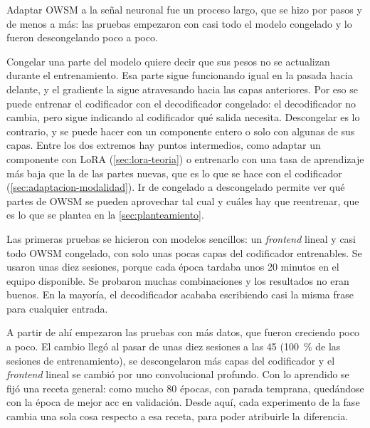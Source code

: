 
Adaptar OWSM a la señal neuronal fue un proceso largo, que se hizo por pasos y de menos a más: las pruebas empezaron con casi todo el modelo congelado y lo fueron descongelando poco a poco.

Congelar una parte del modelo quiere decir que sus pesos no se actualizan durante el entrenamiento. Esa parte sigue funcionando igual en la pasada hacia delante, y el gradiente la sigue atravesando hacia las capas anteriores. Por eso se puede entrenar el codificador con el decodificador congelado: el decodificador no cambia, pero sigue indicando al codificador qué salida necesita. Descongelar es lo contrario, y se puede hacer con un componente entero o solo con algunas de sus capas. Entre los dos extremos hay puntos intermedios, como adaptar un componente con LoRA (\cref{sec:lora-teoria}) o entrenarlo con una tasa de aprendizaje más baja que la de las partes nuevas, que es lo que se hace con el codificador (\cref{sec:adaptacion-modalidad}). Ir de congelado a descongelado permite ver qué partes de OWSM se pueden aprovechar tal cual y cuáles hay que reentrenar, que es lo que se plantea en la \cref{sec:planteamiento}.

Las primeras pruebas se hicieron con modelos sencillos: un \textit{frontend} lineal y casi todo OWSM congelado, con solo unas pocas capas del codificador entrenables. Se usaron unas diez sesiones, porque cada época tardaba unos 20 minutos en el equipo disponible. Se probaron muchas combinaciones y los resultados no eran buenos. En la mayoría, el decodificador acababa escribiendo casi la misma frase para cualquier entrada.

A partir de ahí empezaron las pruebas con más datos, que fueron creciendo poco a poco. El cambio llegó  al pasar de unas diez sesiones a las 45 (\SI{100}{\percent} de las sesiones de entrenamiento), se descongelaron más capas del codificador y el \textit{frontend} lineal se cambió por uno convolucional profundo. Con lo aprendido se fijó una receta general: como mucho 80 épocas, con parada temprana, quedándose con la época de mejor acc en validación. Desde aquí, cada experimento de la fase cambia una sola cosa respecto a esa receta, para poder atribuirle la diferencia.

